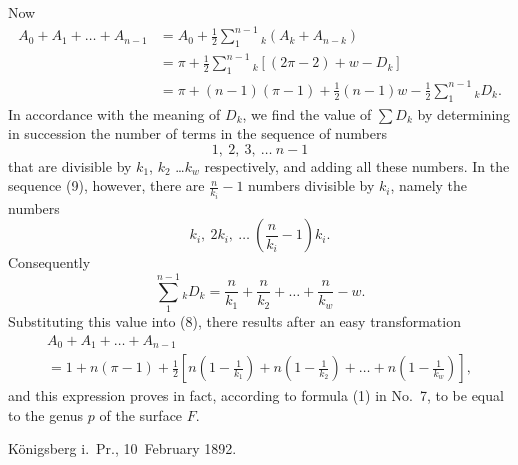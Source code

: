\documentclass{article}
\begin{document}
Now
\[
\begin{aligned}
A_0 + A_1 + \dots + A_{n-1} &= A_0 + \frac{1}{2} \sum_1^{n-1} {}_k (A_k + A_{n-k}) \\
&= \pi + \frac{1}{2} \sum_1^{n-1} {}_k [(2\pi - 2) + w - D_k] \\
&= \pi + (n-1)(\pi-1) + \frac{1}{2}(n-1)w - \frac{1}{2} \sum_1^{n-1} {}_k D_k.
\end{aligned} \tag{8}
\]
In accordance with the meaning of $D_k$, we find the value of $\displaystyle\sum D_k$ by determining in succession the number of terms in the sequence of numbers
\[
1, \ 2, \ 3, \ \dots \ n - 1 \tag{9}
\]
that are divisible by $k_1$, $k_2$ \dots $k_w$ respectively, and adding all these numbers. In the sequence (9), however, there are $\frac{n}{k_i} - 1$ numbers divisible by $k_i$, namely the numbers
\[
k_i, \ 2k_i, \ \dots \ \left(\frac{n}{k_i} - 1\right) k_i.
\]
Consequently
\[
\sum_1^{n-1} {}_k D_k = \frac{n}{k_1} + \frac{n}{k_2} + \dots + \frac{n}{k_w} - w.
\]
Substituting this value into (8), there results after an easy transformation
\[
\begin{aligned}
A_0 + A_1 + \dots + A_{n-1} \\
= 1 + n(\pi - 1) + \frac{1}{2} \left[ n\left(1 - \frac{1}{k_1}\right) + n\left(1 - \frac{1}{k_2}\right) + \dots + n\left(1 - \frac{1}{k_w}\right) \right],
\end{aligned} \tag{10}
\]
and this expression proves in fact, according to formula (1) in No.~7, to be equal to the genus $p$ of the surface $F$.

Königsberg i.~Pr., 10~February 1892.
\end{document}
